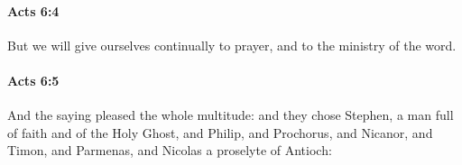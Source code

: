 		\paragraph{Acts 6:4} %
			\label{ACTS-6-4}

			But we will give ourselves continually to prayer, and to the ministry of the word.

			\begin{framed}
			\scriptsize
				\begin{compactdesc}
					\item[SBLG] 
				\end{compactdesc}
			\end{framed}

		\paragraph{Acts 6:5} %
			\label{ACTS-6-5}

			And the saying pleased the whole multitude: and they chose Stephen, a man full of faith and of the Holy Ghost, and Philip, and Prochorus, and Nicanor, and Timon, and Parmenas, and Nicolas a proselyte of Antioch:

